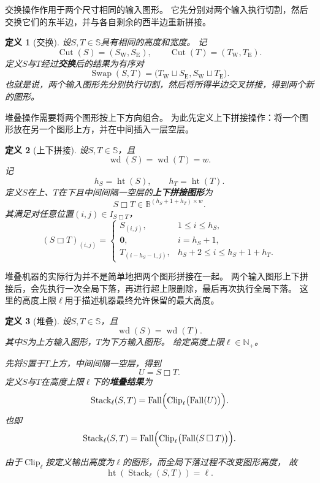 \documentclass[UTF8,fontset=none]{ctexart}
\theoremstyle{cnthm}
\newtheorem{definition}{定义}[section]
\begin{document}
			交换操作作用于两个尺寸相同的输入图形。
			它先分别对两个输入执行切割，然后交换它们的东半边，并与各自剩余的西半边重新拼接。
			
			\begin{definition}[交换]
				设$S,T\in\mathbb{S}$具有相同的高度和宽度。
				记
				$$
				\operatorname{Cut}(S)
				=
				(S_{\mathrm W},S_{\mathrm E}),
				\qquad
				\operatorname{Cut}(T)
				=
				(T_{\mathrm W},T_{\mathrm E}).
				$$
				定义$S$与$T$经过\textbf{交换}后的结果为有序对
				$$
				\operatorname{Swap}(S,T)
				=
				\bigl(
				T_{\mathrm W}\sqcup S_{\mathrm E},
				S_{\mathrm W}\sqcup T_{\mathrm E}
				\bigr).
				$$
				也就是说，两个输入图形先分别执行切割，然后将所得半边交叉拼接，得到两个新的图形。
			\end{definition}
			
			堆叠操作需要将两个图形按上下方向组合。
			为此先定义上下拼接操作：将一个图形放在另一个图形上方，并在中间插入一层空层。
			
			\begin{definition}[上下拼接]
				设$S,T\in\mathbb{S}$，且
				$$
				\operatorname{wd}(S)=\operatorname{wd}(T)=w.
				$$
				记
				$$
				h_S=\operatorname{ht}(S),
				\qquad
				h_T=\operatorname{ht}(T).
				$$
				定义$S$在上、$T$在下且中间间隔一空层的\textbf{上下拼接图形}为
				$$
				S\mathbin{\Box}T\in\mathbb{B}^{(h_S+1+h_T)\times w}.
				$$
				其满足对任意位置$(i,j)\in I_{S\mathbin{\Box}T}$，
				$$
				(S\mathbin{\Box}T)_{(i,j)}
				=
				\begin{cases}
					S_{(i,j)}, & 1\leq i\leq h_S,\\
					\mathbf{0}, & i=h_S+1,\\
					T_{(i-h_S-1,j)}, & h_S+2\leq i\leq h_S+1+h_T.
				\end{cases}
				$$
			\end{definition}
			
			堆叠机器的实际行为并不是简单地把两个图形拼接在一起。
			两个输入图形上下拼接后，会先执行一次全局下落，再进行超上限删除，最后再次执行全局下落。
			这里的高度上限$\ell$用于描述机器最终允许保留的最大高度。
			
			\begin{definition}[堆叠]
				设$S,T\in\mathbb{S}$，且
				$$
				\operatorname{wd}(S)=\operatorname{wd}(T).
				$$
				其中$S$为上方输入图形，$T$为下方输入图形。
				给定高度上限$\ell\in\mathbb{N}_{+}$。
				
				先将$S$置于$T$上方，中间间隔一空层，得到
				$$
				U
				=
				S\mathbin{\Box}T.
				$$
				定义$S$与$T$在高度上限$\ell$下的\textbf{堆叠结果}为
				$$
				\operatorname{Stack}_\ell(S,T)
				=
				\operatorname{Fall}
				\Bigl(
				\operatorname{Clip}_\ell
				\bigl(
				\operatorname{Fall}(U)
				\bigr)
				\Bigr).
				$$
				也即
				$$
				\operatorname{Stack}_\ell(S,T)
				=
				\operatorname{Fall}
				\Bigl(
				\operatorname{Clip}_\ell
				\bigl(
				\operatorname{Fall}
				(
				S\mathbin{\Box}T
				)
				\bigr)
				\Bigr).
				$$
				
				由于$\operatorname{Clip}_\ell$按定义输出高度为$\ell$的图形，而全局下落过程不改变图形高度，
				故
				$$
				\operatorname{ht}(\operatorname{Stack}_\ell(S,T))=\ell.
				$$
			\end{definition}
			
\end{document}

